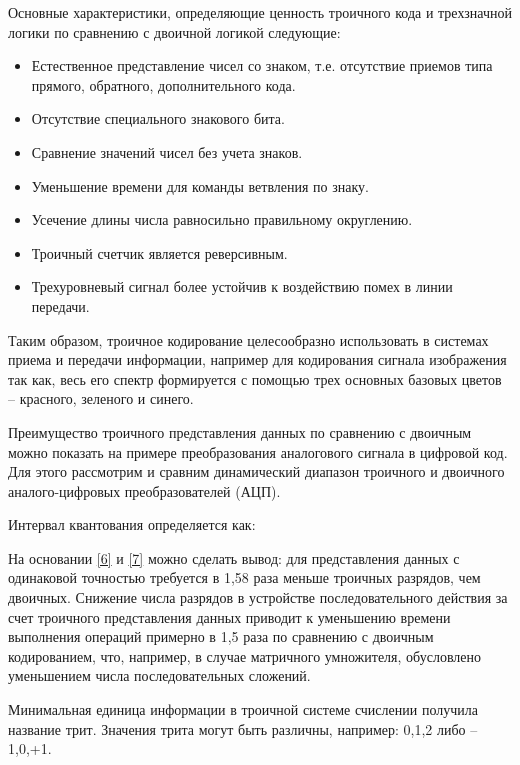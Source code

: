 \documentclass[10pt]{beamer}
\begin{document}

\begin{frame}[shrink=20,fragile]
\transdissolve[duration=0.2]
Основные характеристики, определяющие ценность троичного кода и трехзначной логики по сравнению с двоичной логикой следующие:
\begin{block}{}
\begin{itemize}
    \item Естественное представление чисел со знаком, т.е. отсутствие приемов типа прямого, обратного, дополнительного кода.
    \item Отсутствие специального знакового бита.
    \item Сравнение значений чисел без учета знаков.
    \item Уменьшение времени для команды ветвления по знаку.
    \item Усечение длины числа равносильно правильному округлению.
    \item Троичный счетчик является реверсивным.
    \item Трехуровневый сигнал более устойчив к воздействию помех в линии передачи.
\end{itemize}
	
	Таким образом, троичное кодирование целесообразно использовать в системах приема и передачи информации, например для кодирования сигнала изображения так как, весь его спектр формируется с помощью трех основных базовых цветов – красного, зеленого и синего.
\end{block}   

\end{frame}


\begin{frame}[shrink=20,fragile]
\transdissolve[duration=0.2]
	Преимущество троичного представления данных по сравнению с двоичным можно показать на примере преобразования аналогового сигнала в цифровой код. Для этого рассмотрим и сравним динамический диапазон троичного и двоичного аналого-цифровых преобразователей (АЦП).
\begin{block}{}
	Интервал квантования определяется как:
	

	
	На основании \ref{6} и \ref{7} можно сделать вывод: для представления данных с одинаковой точностью требуется в 1,58 раза меньше троичных разрядов, чем двоичных. Снижение числа разрядов в устройстве последовательного действия за счет троичного представления данных приводит к уменьшению времени выполнения операций примерно в 1,5 раза по сравнению с двоичным кодированием, что, например, в случае матричного умножителя, обусловлено уменьшением числа последовательных сложений.
	
	Минимальная единица информации в троичной системе счислении получила название трит. Значения трита могут быть различны, например: 0,1,2 либо –1,0,+1.
	
\end{block}   
\end{frame}
\end{document}
